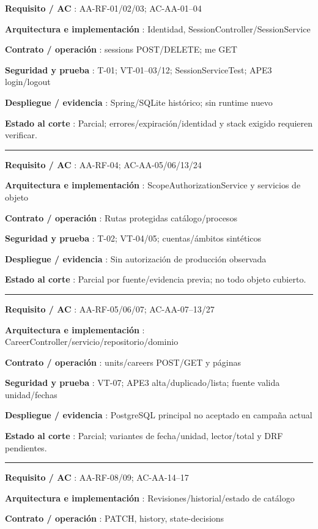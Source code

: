 \documentclass[12pt,a4paper]{report}
\begin{document}
\textbf{Requisito / AC }: AA-RF-01/02/03; AC-AA-01--04

\textbf{Arquitectura e implementación }: Identidad,
SessionController/SessionService

\textbf{Contrato / operación }: sessions POST/DELETE; me GET

\textbf{Seguridad y prueba }: T-01; VT-01--03/12; SessionServiceTest;
APE3 login/logout

\textbf{Despliegue / evidencia }: Spring/SQLite histórico; sin runtime
nuevo

\textbf{Estado al corte }: Parcial; errores/expiración/identidad y stack
exigido requieren verificar.

\medskip\hrule\medskip

\textbf{Requisito / AC }: AA-RF-04; AC-AA-05/06/13/24

\textbf{Arquitectura e implementación }: ScopeAuthorizationService y
servicios de objeto

\textbf{Contrato / operación }: Rutas protegidas catálogo/procesos

\textbf{Seguridad y prueba }: T-02; VT-04/05; cuentas/ámbitos sintéticos

\textbf{Despliegue / evidencia }: Sin autorización de producción
observada

\textbf{Estado al corte }: Parcial por fuente/evidencia previa; no todo
objeto cubierto.

\medskip\hrule\medskip

\textbf{Requisito / AC }: AA-RF-05/06/07; AC-AA-07--13/27

\textbf{Arquitectura e implementación
}: CareerController/servicio/repositorio/dominio

\textbf{Contrato / operación }: units/careers POST/GET y páginas

\textbf{Seguridad y prueba }: VT-07; APE3 alta/duplicado/lista; fuente
valida unidad/fechas

\textbf{Despliegue / evidencia }: PostgreSQL principal no aceptado en
campaña actual

\textbf{Estado al corte }: Parcial; variantes de fecha/unidad,
lector/total y DRF pendientes.

\medskip\hrule\medskip

\textbf{Requisito / AC }: AA-RF-08/09; AC-AA-14--17

\textbf{Arquitectura e implementación }: Revisiones/historial/estado de
catálogo

\textbf{Contrato / operación }: PATCH, history, state-decisions
\end{document}
